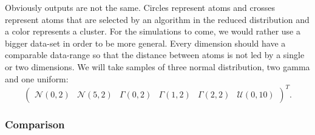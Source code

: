 \documentclass{amsart}
\begin{document}
Obviously outputs are not the same. Circles represent atoms and crosses represent atoms that are selected by an algorithm in the reduced distribution and a color represents a cluster. For the simulations to come, we would rather use a bigger data-set in order to be more general. Every dimension should have a comparable data-range so that the distance between atoms is not led by a single or two dimensions. We will take samples of three normal distribution, two gamma and one uniform:
$$
\begin{pmatrix}
    \mathcal{N}\left(0,2\right) & \mathcal{N}\left(5,2\right) & \Gamma\left(0,2\right) & \Gamma\left(1,2\right) &\Gamma\left(2,2\right) & \mathcal{U}\left(0,10\right)
\end{pmatrix}^T.
$$

\subsubsection{Comparison}
\end{document}
